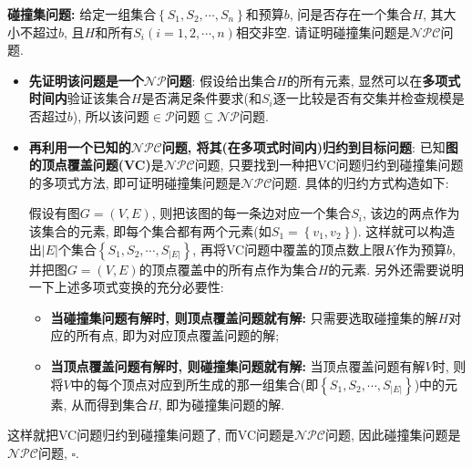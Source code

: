 \documentclass{article}
\begin{document}
\begin{homeworkProblem}
	\textbf{碰撞集问题:} 给定一组集合$\left\{ S_1,S_2,\cdots ,S_n \right\}$和预算$b$, 问是否存在一个集合$H$, 其大小不超过$b$, 且$H$和所有$S_i(i=1,2,\cdots,n)$相交非空. 请证明碰撞集问题是$\mathcal{NPC}$问题.

	\solution
	\begin{itemize}
		\item \textbf{先证明该问题是一个$\mathcal{NP}$问题}: 假设给出集合$H$的所有元素, 显然可以在\textbf{多项式时间内}验证该集合$H$是否满足条件要求(和$S_i$逐一比较是否有交集并检查规模是否超过$b$), 所以该问题$\in \mathcal{P}$问题$\subseteq \mathcal{NP}$问题.
		\item \textbf{再利用一个已知的$\mathcal{NPC}$问题, 将其(在多项式时间内)归约到目标问题}: 已知\textbf{图的顶点覆盖问题(VC)}是$\mathcal{NPC}$问题, 只要找到一种把VC问题归约到碰撞集问题的多项式方法, 即可证明碰撞集问题是$\mathcal{NPC}$问题. 具体的归约方式构造如下:
		
		假设有图$G=(V,E)$, 则把该图的每一条边对应一个集合$S_i$, 该边的两点作为该集合的元素, 即每个集合都有两个元素(如$S_1=\left\{ v_1,v_2 \right\}$). 这样就可以构造出$|E|$个集合$\left\{ S_1,S_2,\cdots ,S_{\left| E \right|} \right\}$, 再将VC问题中覆盖的顶点数上限$K$作为预算$b$, 并把图$G=(V,E)$的顶点覆盖中的所有点作为集合$H$的元素. 另外还需要说明一下上述多项式变换的充分必要性:
		\begin{itemize}
			\item \textbf{当碰撞集问题有解时, 则顶点覆盖问题就有解:} 只需要选取碰撞集的解$H$对应的所有点, 即为对应顶点覆盖问题的解;
			\item \textbf{当顶点覆盖问题有解时, 则碰撞集问题就有解:} 当顶点覆盖问题有解$V$时, 则将$V$中的每个顶点对应到所生成的那一组集合(即$\left\{ S_1,S_2,\cdots ,S_{\left| E \right|} \right\}$)中的元素, 从而得到集合$H$, 即为碰撞集问题的解.
		\end{itemize}
	\end{itemize}
	这样就把VC问题归约到碰撞集问题了, 而VC问题是$\mathcal{NPC}$问题, 因此碰撞集问题是$\mathcal{NPC}$问题, $\square$.
\end{homeworkProblem}
\end{document}
